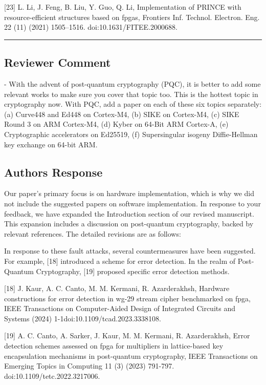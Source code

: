 [23] L. Li, J. Feng, B. Liu, Y. Guo, Q. Li, Implementation of PRINCE with resource-efficient structures based on fpgas, Frontiers Inf. Technol. Electron. Eng. 22 (11) (2021) 1505–1516. doi:10.1631/FITEE.2000688.

\color{black}

\noindent\rule{\linewidth}{2.0pt}

\subsection{Reviewer Comment}
- With the advent of post-quantum cryptography (PQC), it is better to add some relevant works to make sure you cover that topic too. This is the hottest topic in cryptography now. With PQC, add a paper on each of these six topics separately: (a) Curve448 and Ed448 on Cortex-M4, (b) SIKE on Cortex-M4, (c) SIKE Round 3 on ARM Cortex-M4, (d) Kyber on 64-Bit ARM Cortex-A, (e) Cryptographic accelerators on Ed25519, (f) Supersingular isogeny Diffie-Hellman key exchange on 64-bit ARM.

\subsection{Authors Response}


 Our paper's primary focus is on hardware implementation, which is why we did not include the suggested papers on software implementation. In response to your feedback, we have expanded the Introduction section of our revised manuscript. This expansion includes a discussion on post-quantum cryptography, backed by relevant references. The detailed revisions are as follows:

\color{blue}

In response to these fault attacks, several countermeasures have been suggested. For example, [18] introduced a scheme for error detection. In the realm of Post-Quantum Cryptography, [19] proposed specific error detection methods.

	[18] J. Kaur, A. C. Canto, M. M. Kermani, R. Azarderakhsh, Hardware constructions for error detection in wg-29 stream cipher benchmarked on fpga, IEEE Transactions on Computer-Aided Design of Integrated Circuits and Systems (2024) 1-1doi:10.1109/tcad.2023.3338108.

[19] A. C. Canto, A. Sarker, J. Kaur, M. M. Kermani, R. Azarderakhsh, Error detection schemes assessed on fpga for multipliers in lattice-based key encapsulation mechanisms in post-quantum cryptography, IEEE Transactions on Emerging Topics in Computing 11 (3) (2023) 791-797. doi:10.1109/tetc.2022.3217006.

